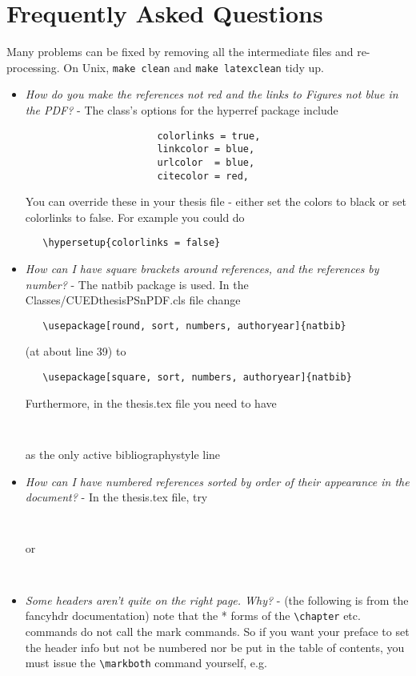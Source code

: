 \documentclass{article}
\begin{document}
\section{Frequently Asked Questions}
Many problems can be fixed by removing all the intermediate files and
re-processing. On Unix, \texttt{make clean} and \texttt{make latexclean} tidy up.
\begin{itemize}
\item \textit{How do you make the references not red and the links to Figures not blue in the PDF?} - The class's options for the hyperref package include  
\begin{verbatim}
                       colorlinks = true,
                       linkcolor = blue,
                       urlcolor  = blue,
                       citecolor = red,
\end{verbatim}
You can override these in your thesis file - either set the colors to black or set colorlinks to false. For example you could do
\begin{verbatim}
   \hypersetup{colorlinks = false}
\end{verbatim}

\item \textit{How can I have square brackets around references, and the references by number?} - The natbib package is used. In the Classes/CUEDthesisPSnPDF.cls file change
\begin{verbatim}
   \usepackage[round, sort, numbers, authoryear]{natbib}
\end{verbatim}
      (at about line 39) to
\begin{verbatim}
   \usepackage[square, sort, numbers, authoryear]{natbib}
\end{verbatim}
      Furthermore, in the thesis.tex file you need to have
\begin{verbatim}
   
\end{verbatim}
as the only active bibliographystyle line
\item \textit{How can I have numbered references sorted by order of their appearance in the document?} - In the thesis.tex file, try
\begin{verbatim}
       
\end{verbatim}
      or
\begin{verbatim}
       
\end{verbatim}
\item \textit{Some headers aren't quite on the right page. Why?} - (the following is from the fancyhdr documentation) note that the * forms of the  \verb|\chapter| etc. commands do not call the mark commands. So if you want your preface to set the header info but not be numbered nor be put in the table of contents, you must issue the  \verb|\markboth| command yourself, e.g.
\begin{verbatim}

\end{verbatim}
\end{itemize}
\end{document}
